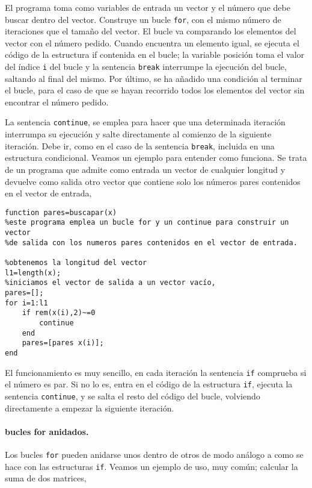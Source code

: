 El programa toma como variables de entrada un vector y el número que debe buscar dentro del vector. Construye un bucle \texttt{for}, con el mismo número de iteraciones que el tamaño del vector. El bucle va comparando los elementos del vector con el número pedido. Cuando encuentra un elemento igual, se ejecuta el código de la estructura if contenida en el bucle; la variable posición toma el valor del índice \texttt{i} del bucle y la sentencia \texttt{break} interrumpe la ejecución del bucle, saltando al final del mismo. Por último, se ha añadido una condición al terminar el bucle, para el caso de que se hayan recorrido todos los elementos del vector sin encontrar el número pedido.

La sentencia \texttt{continue}, se emplea para hacer que una determinada iteración interrumpa su ejecución y salte directamente al comienzo de la siguiente iteración. Debe ir, como en el caso de la sentencia \texttt{break}, incluida en una estructura condicional. Veamos un ejemplo para entender como funciona. Se trata de un programa que admite como entrada un vector de cualquier longitud y devuelve como salida otro vector que contiene solo los números pares contenidos en el vector de entrada,

\begin{verbatim}
function pares=buscapar(x)
%este programa emplea un bucle for y un continue para construir un vector
%de salida con los numeros pares contenidos en el vector de entrada.

%obtenemos la longitud del vector
l1=length(x);
%iniciamos el vector de salida a un vector vacío,
pares=[];
for i=1:l1
    if rem(x(i),2)~=0
        continue
    end
    pares=[pares x(i)];
end
\end{verbatim}

El funcionamiento es muy sencillo, en cada iteración la sentencia \texttt{if} comprueba si el número es par. Si no lo es, entra en el código de la estructura \texttt{if}, ejecuta la sentencia \texttt{continue}, y se salta el resto del código del bucle, volviendo directamente a empezar la siguiente iteración.

\paragraph{bucles for anidados.} Los bucles \texttt{for} pueden anidarse unos dentro de otros de modo análogo a como se hace con las estructuras \texttt{if}. Veamos un ejemplo de uso, muy común; calcular la suma de dos matrices,

